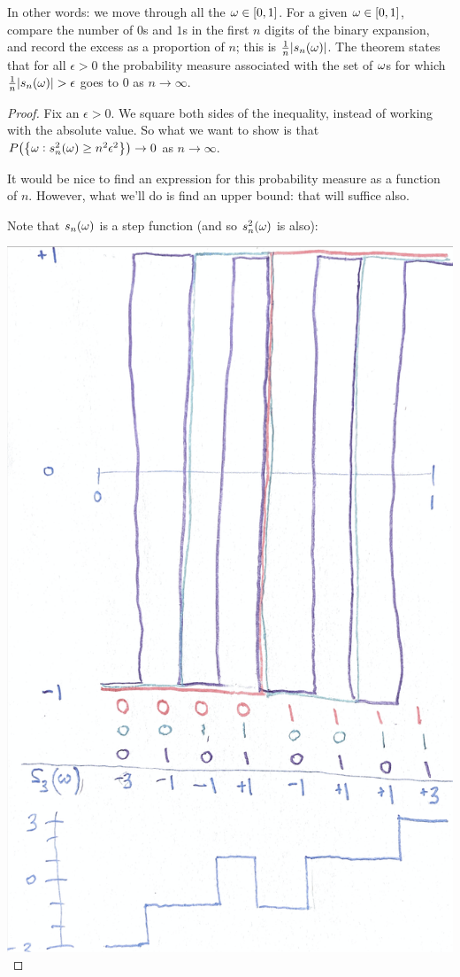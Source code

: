 In other words: we move through all the $\omega \in [0, 1]$. For a given $\omega \in [0, 1]$, compare the number
of $0$s and $1$s in the first $n$ digits of the binary expansion, and record the excess as a proportion of $n$;
this is $\frac{1}{n}|s_n(\omega)|$. The theorem states that for all $\epsilon > 0$ the probability measure
associated with the set of $\omega$s for which $\frac{1}{n}|s_n(\omega)| > \epsilon$ goes to $0$ as $n \to \infty$.

\begin{proof}
  Fix an $\epsilon > 0$. We square both sides of the inequality, instead of working with the absolute value. So
  what we want to show is that $P\big(\big\{\omega: s_n^2(\omega) \geq n^2\epsilon^2\big\}\big) \to 0$
  as $n \to \infty$.

  It would be nice to find an expression for this probability measure as a function of $n$. However, what we'll
  do is find an upper bound: that will suffice also.

  Note that $s_n(\omega)$ is a step function (and so $s_n^2(\omega)$ is also):

\includegraphics[width=400pt]{img/analysis--real-analysis--measure-theory--weak-law-of-large-numbers-c049.png}



\end{proof}
